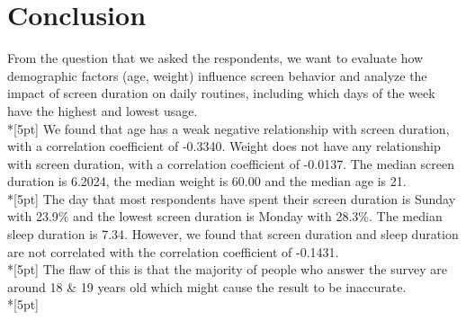 \chapter*{Conclusion}
From the question that we asked the respondents, we want to evaluate how demographic factors (age, weight) influence screen behavior and analyze the impact of screen duration on daily routines, including which days of the week have the highest and lowest usage.\\*[5pt]
We found that age has a weak negative relationship with screen duration, with a correlation coefficient of -0.3340. Weight does not have any relationship with screen duration, with a correlation coefficient of -0.0137. The median screen duration is 6.2024, the median weight is 60.00 and the median age is 21.\\*[5pt]
The day that most respondents have spent their screen duration is Sunday with 23.9\% and the lowest screen duration is Monday with 28.3\%. The median sleep duration is 7.34. However, we found that screen duration and sleep duration are not correlated with the correlation coefficient of -0.1431.\\*[5pt]
The flaw of this is that the majority of people who answer the survey are around 18 \& 19 years old which might cause the result to be inaccurate.\\*[5pt]